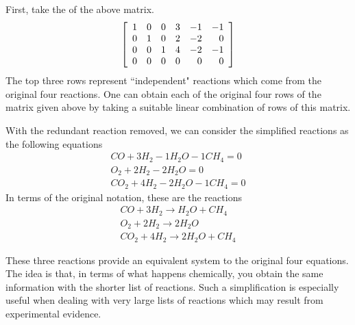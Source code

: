 First, take the {\rref} of the above matrix. 
\begin{equation*}
\left[
\begin{array}{rrrrrr}
1 & 0 & 0 & 3 & -1 & -1 \\
0 & 1 & 0 & 2 & -2 & 0 \\
0 & 0 & 1 & 4 & -2 & -1 \\
0 & 0 & 0 & 0 & 0 & 0
\end{array}
\right]
\end{equation*}
The top three rows represent \textquotedblleft independent" reactions which
come from the original four reactions. One can obtain each of the original
four rows of the  matrix given above by taking a suitable
linear combination of rows of this {\rref} matrix.

With the redundant reaction removed, we can consider the simplified reactions as the following equations
\begin{equation*}
\begin{array}{c}
CO+3H_{2}-1H_{2}O-1CH_{4}=0 \\
O_{2}+2H_{2}-2H_{2}O=0 \\
CO_{2}+4H_{2}-2H_{2}O-1CH_{4}=0
\end{array}
\end{equation*}
In terms of the original notation, these are the reactions
\begin{equation*}
\begin{array}{c}
CO+3H_{2}\rightarrow H_{2}O+CH_{4} \\
O_{2}+2H_{2}\rightarrow 2H_{2}O \\
CO_{2}+4H_{2}\rightarrow 2H_{2}O+CH_{4}
\end{array}
\end{equation*}

These three reactions provide an equivalent system to the original four equations. The idea is that, in terms of what happens chemically, you
obtain the same information with the shorter list of reactions. Such a simplification is especially useful when dealing with very large lists of reactions which may result from experimental evidence. 
